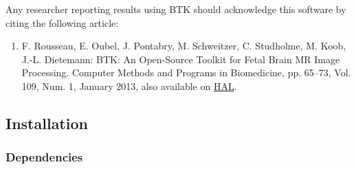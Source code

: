 \documentclass[a4paper,10pt]{article}
\begin{document}
Any researcher reporting results using BTK should acknowledge this software by citing the following article:
\begin{enumerate}
\item F. Rousseau, E. Oubel, J. Pontabry, M. Schweitzer, C. Studholme, M. Koob, J.-L. Dietemann: BTK: An Open-Source Toolkit for Fetal Brain MR Image Processing. Computer Methods and Programs in Biomedicine, pp. 65--73, Vol. 109, Num. 1, January 2013, also available on \href{http://hal.archives-ouvertes.fr/index.php?halsid=d0mrvug09qhhou49vgaqc6ogd3&view_this_doc=hal-00671183&version=1}{HAL}.
\end{enumerate}

\subsection{Installation}

\subsubsection{Dependencies}
\end{document}
